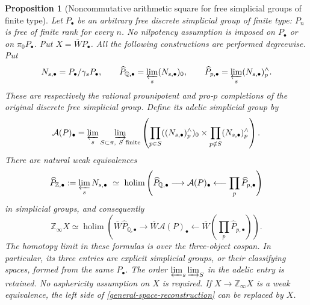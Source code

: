 \documentclass[11pt,a4paper]{article}
\newtheorem{proposition}[theorem]{Proposition}
\begin{document}
\begin{proposition}[Noncommutative arithmetic square for free simplicial groups of finite type]
\label{general-free-arithmetic}
Let $P_\bullet$ be an arbitrary free discrete simplicial group of
finite type: $P_n$ is free of finite rank for every $n$.  No nilpotency
assumption is imposed on $P_\bullet$ or on $\pi_0P_\bullet$.
Put $X=\overline WP_\bullet$.  All the following constructions are
performed degreewise.  Put
\[
 N_{s,\bullet}=P_\bullet/\gamma_sP_\bullet,\qquad
 \widehat P_{\mathbb Q,\bullet}=\varprojlim_s(N_{s,\bullet})_0,
 \qquad
 \widehat P_{p,\bullet}=\varprojlim_s(N_{s,\bullet})_p^{\wedge}.
\]
These are respectively the rational prounipotent and pro-$p$
completions of the original discrete free simplicial group.  Define
its adelic simplicial group by
\[
 \mathcal A(P)_\bullet=
 \varprojlim_s\varinjlim_{S\subset\pi,\ S\text{ finite}}
 \left(
 \prod_{p\in S}((N_{s,\bullet})_p^{\wedge})_0
 \times\prod_{p\notin S}(N_{s,\bullet})_p^{\wedge}
 \right).
\]
There are natural weak equivalences
\begin{equation}\label{general-group-reconstruction}
 \widehat P_{\mathbb Z,\bullet}:=
 \varprojlim_sN_{s,\bullet}\ \simeq\
 \operatorname{holim}\left(
 \widehat P_{\mathbb Q,\bullet}\longrightarrow\mathcal A(P)_\bullet
 \longleftarrow\prod_p\widehat P_{p,\bullet}\right)
\end{equation}
in simplicial groups, and consequently
\begin{equation}\label{general-space-reconstruction}
 \mathbb Z_\infty X\simeq
 \operatorname{holim}\left(
 \overline W\widehat P_{\mathbb Q,\bullet}
 \longrightarrow\overline W\mathcal A(P)_\bullet
 \longleftarrow\overline W\!\left(\prod_p\widehat P_{p,\bullet}\right)
 \right).
\end{equation}
The homotopy limit in these formulas is over the three-object cospan.
In particular, its three entries are explicit simplicial groups, or
 their classifying spaces, formed from the same $P_\bullet$.
The order $\varprojlim_s\varinjlim_S$ in the adelic entry is retained.
No asphericity assumption on $X$ is required.  If $X\to\mathbb Z_\infty X$
is a weak equivalence, the left side of
\eqref{general-space-reconstruction} can be replaced by $X$.
\end{proposition}
\end{document}
